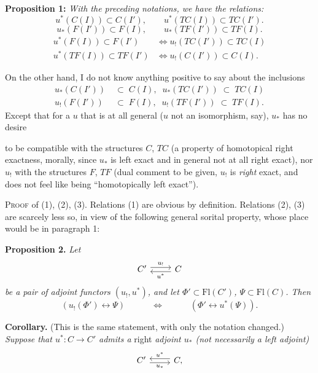 \documentclass[11pt]{article}
\newcommand{\msp}[1]{\marginpar{\footnotesize [#1]}}
\newcommand{\Fl}{\mathrm{Fl}}
\begin{document}
\textbf{Proposition 1:} \textit{With the preceding notations, we have the relations:}
\[
u^*(C(I)) \subset C(I'), \qquad u^*(TC(I)) \subset TC(I'). \tag*{(1)}
\]
\[
u_*(F(I')) \subset F(I), \qquad u_*(TF(I')) \subset TF(I). \tag*{(2)}
\]
\[
\begin{aligned}
u^*(F(I)) \subset F(I') &\iff u_{!}(TC(I')) \subset TC(I)\\
u^*(TF(I)) \subset TF(I') &\iff u_{!}(C(I')) \subset C(I).
\end{aligned} \tag*{(3)}
\]

On the other hand, I do not know anything positive to say about the inclusions
\[
\begin{aligned}
u_*(C(I')) \;&\subset\; C(I), \;\; u_*(TC(I')) \;\subset\; TC(I)\\
u_{!}(F(I')) \;&\subset\; F(I), \;\; u_{!}(TF(I')) \;\subset\; TF(I).
\end{aligned}
\]
Except that for a $u$ that is at all general ($u$ not an isomorphism, say), $u_*$ has no desire

\noindent\msp{page 46}

\noindent to be compatible with the structures $C$, $TC$ (a property of homotopical right exactness, morally, since $u_*$ is left exact and in general not at all right exact), nor $u_{!}$ with the structures $F$, $TF$ (dual comment to be given, $u_{!}$ is \textit{right} exact, and does not feel like being ``homotopically left exact''). %

\textsc{Proof} of (1), (2), (3). Relations (1) are obvious by definition. Relations (2), (3) are scarcely less so, in view of the following general sorital property, whose place would be in paragraph 1:

\textbf{Proposition 2.} \textit{Let}
\[
\begin{tikzcd}
C' \arrow[r, shift left, "u_{!}"] & C \arrow[l, shift left, "u^*"]
\end{tikzcd}
\]
\textit{be a pair of adjoint functors $(u_{!},u^*)$, and let $\Phi' \subset \Fl(C')$, $\Psi \subset \Fl(C)$. Then}
\[
(u_{!}(\Phi') \longleftrightarrow \Psi) \qquad\quad \iff \qquad\quad (\Phi' \longleftrightarrow u^*(\Psi)).
\]

\textbf{Corollary.} (This is the same statement, with only the notation changed.) \textit{Suppose that $u^* : C \longrightarrow C'$ admits a} right \textit{adjoint $u_*$ (not necessarily a left adjoint)}
\[
\begin{tikzcd}
C' \arrow[r, shift right, "u_*"'] & C, \arrow[l, shift right, "u^*"']
\end{tikzcd}
\]
\end{document}
